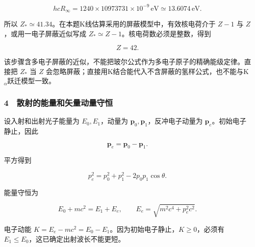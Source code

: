 \documentclass[12pt,a4paper,fontset=fandol]{ctexart}
\begin{document}
\[hcR_\infty=1240\times10973731\times10^{-9}\,\mathrm{eV}
\simeq13.6074\,\mathrm{eV}.\]

所以 \(Z_*\simeq41.34\)。在本题K线估算采用的屏蔽模型中，有效核电荷介于
\(Z-1\) 与 \(Z\)，或用一电子屏蔽近似写成
\(Z_*\simeq Z-1\)。核电荷数必须是整数，得到

\[\boxed{Z=42.}\]

该步骤含多电子屏蔽的近似，不能把玻尔公式作为多电子原子的精确能级定律。直接把
\(Z_*\) 当 \(Z\)
会忽略屏蔽；直接用K结合能代入不含屏蔽的氢样公式，也不能与K\(_\alpha\)跃迁模型一致。

\subsubsection{4　散射的能量和矢量动量守恒}\label{ux6563ux5c04ux7684ux80fdux91cfux548cux77e2ux91cfux52a8ux91cfux5b88ux6052}

设入射和出射光子能量为 \(E_0,E_1\)，动量为
\(\boldsymbol p_0,\boldsymbol p_1\)，反冲电子动量为
\(\boldsymbol p_e\)。初始电子静止，因此

\[\boldsymbol p_e=\boldsymbol p_0-\boldsymbol p_1.\]

平方得到

\[p_e^2=p_0^2+p_1^2-2p_0p_1\cos\theta.\]

能量守恒为

\[\boxed{E_0+mc^2=E_1+E_e,\qquad
E_e=\sqrt{m^2c^4+p_e^2c^2}.}\]

电子动能 \(K=E_e-mc^2=E_0-E_1\)。因为初始电子静止，\(K\ge0\)，必须有
\(E_1\le E_0\)，这已确定出射波长不能更短。

\begin{center}
\begin{minipage}{\linewidth}
\centering\begingroup{}
\ifdim\wd\diagrambox>.88\linewidth
\sbox{\diagrambox}{\resizebox{.88\linewidth}{!}{\usebox{\diagrambox}}}\fi
\ifdim\ht\diagrambox>.38\textheight
\resizebox{!}{.38\textheight}{\usebox{\diagrambox}}
\else\usebox{\diagrambox}\fi
\par{}\endgroup\end{minipage}\end{center}
\end{document}
